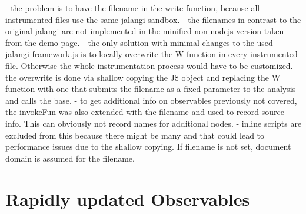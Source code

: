 	
	- the problem is to have the filename in the write function, because all instrumented files use the same jalangi sandbox.
	- the filenames in contrast to the original jalangi are not implemented in the minified non nodejs version taken from the demo page.
	- the only solution with minimal changes to the used jalangi-framework.js is to locally overwrite the W function in every instrumented file. Otherwise the whole instrumentation process would have to be customized.
	- the overwrite is done via shallow copying the J\$ object and replacing the W function with one that submits the filename as a fixed parameter to the analysis and calls the base.
	- to get additional info on observables previously not covered, the invokeFun was also extended with the filename and used to record source info. This can obviously not record names for additional nodes.
	- inline scripts are excluded from this because there might be many and that could lead to performance issues due to the shallow copying.
	If filename is not set, document domain is assumed for the filename.
	

\section{Rapidly updated Observables}
\label{sec:RapidlyUpdatedObservables}
	
